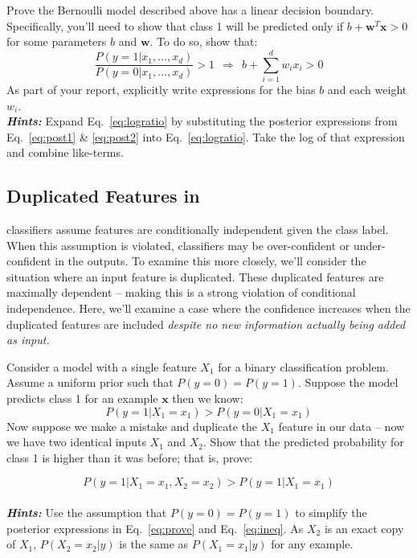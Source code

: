 \documentclass[a4paper,10pt]{article}
\begin{document}
\begin{taskbox}
 Prove the Bernoulli \nb model described above has a linear decision boundary. Specifically, you'll need to show that class 1 will be predicted only if $b+\mathbf{w}^T\mathbf{x} > 0$ for some parameters $b$ and $\mathbf{w}$. To do so, show that:
%
\begin{equation}
    \frac{P(y=1 | x_1,...,x_d)}{P(y=0 | x_1,...,x_d)} > 1 ~~\Longrightarrow~~ b+\sum_{i=1}^d w_ix_i > 0
\end{equation}
%
As part of your report, explicitly write expressions for the bias $b$ and each weight $w_i$.\\[5pt]

\emph{\textbf{Hints:}} Expand Eq.~\eqref{eq:logratio} by substituting the posterior expressions from Eq.~\eqref{eq:post1} \& \eqref{eq:post2} into Eq.~\eqref{eq:logratio}. Take the log of that expression and combine like-terms. 
\end{taskbox}


\subsection{Duplicated Features in \nb}
\nb classifiers assume features are conditionally independent given the class label. When this assumption is violated, \nb classifiers may be over-confident or under-confident in the outputs. To examine this more closely, we'll consider the situation where an input feature is duplicated. These duplicated features are maximally dependent -- making this is a strong violation of conditional independence. Here, we'll examine a case where the confidence increases when the duplicated features are included \emph{despite no new information actually being added as input.}

\begin{taskbox}
 Consider a \nb model with a single feature $X_1$ for a binary classification problem. Assume a uniform prior such that $P(y=0) = P(y=1)$. Suppose the model predicts class 1 for an example $\mathbf{x}$ then we know:
%
\begin{equation}
    P(y=1|X_1=x_1) > P(y=0|X_1=x_1)
    \label{eq:ineq}
\end{equation}
%
Now suppose we make a mistake and duplicate the $X_1$ feature in our data -- now we have two identical inputs $X_1$ and $X_2$. Show that the predicted probability for class 1 is higher than it was before; that is, prove:

\begin{equation}
    P(y=1|X_1=x_1, X_2=x_2) > P(y=1|X_1=x_1)
    \label{eq:prove}
\end{equation}\\[5pt]

\emph{\textbf{Hints:}} Use the assumption that $P(y=0)=P(y=1)$ to simplify the posterior expressions in Eq.~\eqref{eq:prove} and Eq.~\eqref{eq:ineq}. As $X_2$ is an exact copy of $X_1$, $P(X_2=x_2 | y)$ is the same as $P(X_1=x_1 | y)$ for any example.
\end{taskbox}
\end{document}
